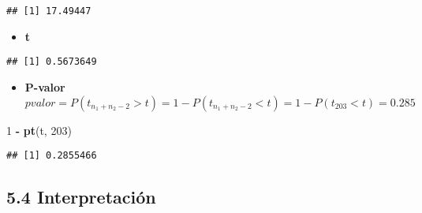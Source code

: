 \documentclass[
]{article}
\newenvironment{Shaded}{\begin{snugshade}}{\end{snugshade}}
\newcommand{\CommentTok}[1]{\textcolor[rgb]{0.56,0.35,0.01}{\textit{#1}}}
\newcommand{\DecValTok}[1]{\textcolor[rgb]{0.00,0.00,0.81}{#1}}
\newcommand{\KeywordTok}[1]{\textcolor[rgb]{0.13,0.29,0.53}{\textbf{#1}}}
\newcommand{\NormalTok}[1]{#1}
\newcommand{\OperatorTok}[1]{\textcolor[rgb]{0.81,0.36,0.00}{\textbf{#1}}}
\newcommand{\StringTok}[1]{\textcolor[rgb]{0.31,0.60,0.02}{#1}}
\providecommand{\tightlist}{%
  \setlength{\itemsep}{0pt}\setlength{\parskip}{0pt}}
\begin{document}
\begin{verbatim}
## [1] 17.49447
\end{verbatim}

\begin{itemize}
\tightlist
\item
  \textbf{t}
\end{itemize}

\begin{Shaded}
\end{Shaded}

\begin{verbatim}
## [1] 0.5673649
\end{verbatim}

\begin{itemize}
\tightlist
\item
  \textbf{P-valor}
  \[ pvalor = P(t_{n_1 + n_2 - 2} > t) = 1 - P(t_{n_1 + n_2 - 2} < t) = 1 - P(t_{203} < t) = 0.285 \]
\end{itemize}

\begin{Shaded}
\begin{Highlighting}[]
\DecValTok{1} \OperatorTok{-}\StringTok{ }\KeywordTok{pt}\NormalTok{(t, }\DecValTok{203}\NormalTok{)}
\end{Highlighting}
\end{Shaded}

\begin{verbatim}
## [1] 0.2855466
\end{verbatim}

\hypertarget{interpretaciuxf3n-1}{%
\subsection{5.4 Interpretación}\label{interpretaciuxf3n-1}}
\end{document}
